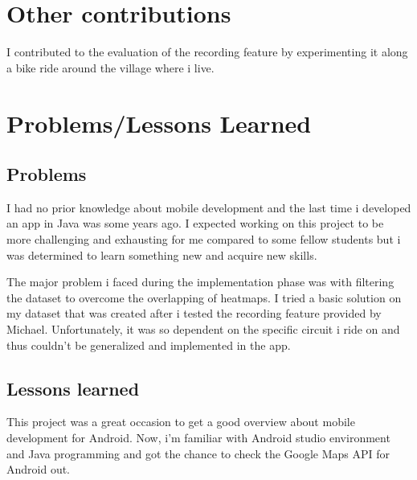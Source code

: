 \documentclass[10pt,a4paper]{article} %
\begin{document}
    \section{Other contributions}

     I contributed to the evaluation of the recording feature by experimenting it along a bike ride around the village where i live.



	
	\section{Problems/Lessons Learned}\label{sec:prob_less}
     \subsection{Problems}\label{subsec:prob}
     
    I had no prior knowledge about mobile development and the last time i developed an app in Java was some years ago. I expected working on this project to be more challenging and exhausting for me compared to some fellow students but i was determined to learn something new and acquire new skills.
    
	\noindent
	The major problem i faced during the implementation phase was with filtering the dataset to overcome the overlapping of heatmaps. I tried a basic solution on my dataset that was created after i tested the recording feature provided by Michael. Unfortunately, it was so dependent on the specific circuit i ride on and thus couldn't be generalized and implemented in the app.
    
    \subsection{Lessons learned}\label{subsec:less}
	This project was a great occasion to get a good overview about mobile development for Android. 
	Now, i'm familiar with Android studio environment and Java programming and got the chance to check the Google Maps API for Android out.





    
%    
%    
\end{document}
